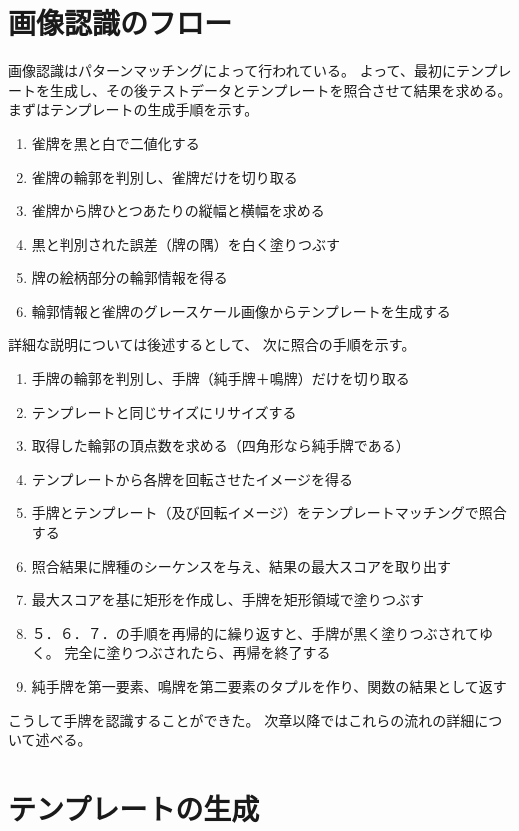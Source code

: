 \documentclass{jsarticle}
\begin{document}
\begin{multicols}{2}
\section{画像認識のフロー}

画像認識はパターンマッチングによって行われている。
よって、最初にテンプレートを生成し、その後テストデータとテンプレートを照合させて結果を求める。
まずはテンプレートの生成手順を示す。
\begin{enumerate}
\item 雀牌を黒と白で二値化する
\item 雀牌の輪郭を判別し、雀牌だけを切り取る
\item 雀牌から牌ひとつあたりの縦幅と横幅を求める
\item 黒と判別された誤差（牌の隅）を白く塗りつぶす
\item 牌の絵柄部分の輪郭情報を得る
\item 輪郭情報と雀牌のグレースケール画像からテンプレートを生成する
\end{enumerate}

詳細な説明については後述するとして、
次に照合の手順を示す。
\begin{enumerate}
\item 手牌の輪郭を判別し、手牌（純手牌＋鳴牌）だけを切り取る
\item テンプレートと同じサイズにリサイズする
\item 取得した輪郭の頂点数を求める（四角形なら純手牌である）
\item テンプレートから各牌を回転させたイメージを得る
\item 手牌とテンプレート（及び回転イメージ）をテンプレートマッチングで照合する
\item 照合結果に牌種のシーケンスを与え、結果の最大スコアを取り出す
\item 最大スコアを基に矩形を作成し、手牌を矩形領域で塗りつぶす
\item ５．６．７．の手順を再帰的に繰り返すと、手牌が黒く塗りつぶされてゆく。
		  完全に塗りつぶされたら、再帰を終了する
\item 純手牌を第一要素、鳴牌を第二要素のタプルを作り、関数の結果として返す
\end{enumerate}

こうして手牌を認識することができた。
次章以降ではこれらの流れの詳細について述べる。

\section{テンプレートの生成}


\end{multicols}
\end{document}
